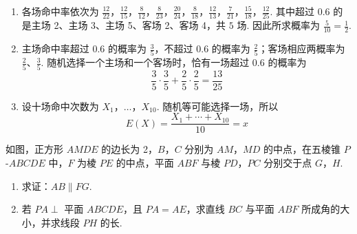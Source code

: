 \begin{solution}
\begin{enumerate}
\item 各场命中率依次为
\(\frac{12}{22}\)，\(\frac{12}{15}\)，\(\frac{8}{12}\)，\(\frac{8}{23}\)，\(\frac{20}{24}\)，\(\frac{8}{18}\)，\(\frac{12}{13}\)，\(\frac{7}{21}\)，\(\frac{15}{18}\)，\(\frac{12}{25}\).
其中超过 \(0.6\) 的是主场 2、主场 3、主场 5、客场 2、客场 4，共 \(5\) 场. 因此所求概率为 \(\frac5{10}=\frac12\).
\item 主场命中率超过 \(0.6\) 的概率为 \(\frac35\)，不超过 \(0.6\) 的概率为 \(\frac25\)；客场相应两概率为 \(\frac25\)、\(\frac35\). 随机选择一个主场和一个客场时，恰有一场超过 \(0.6\) 的概率为
\[
\frac35\cdot\frac35+\frac25\cdot\frac25=\frac{13}{25}
\]
\item 设十场命中次数为 \(X_{1}\)，\(\ldots\)，\(X_{10}\). 随机等可能选择一场，所以
\[
E(X)=\frac{X_{1}+\cdots+X_{10}}{10}=x
\]
\end{enumerate}
\end{solution}

\begin{problem}
如图，正方形 \(AMDE\) 的边长为 2，\(B\)，\(C\) 分别为 \(AM\)，\(MD\) 的中点，在五棱锥 \(P\)-\(ABCDE\) 中，\(F\) 为棱 \(PE\) 的中点，平面 \(ABF\) 与棱 \(PD\)，\(PC\) 分别交于点 \(G\)，\(H\).

\begin{enumerate}
\item 求证：\(AB \parallel FG\).
\item 若 \(PA \perp\) 平面 \(ABCDE\)，且 \(PA = AE\)，求直线 \(BC\) 与平面 \(ABF\) 所成角的大小，并求线段 \(PH\) 的长.
\end{enumerate}

\end{problem}

